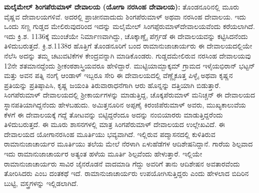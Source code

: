 \textbf{ಮಲೈಮೇಲ್​ ಶಿಂಗಪೆರುಮಾಳ್​ ದೇವಾಲಯ (ಯೋಗಾ ನರಸಿಂಹ ದೇವಾಲಯ):} ತೊಂಡನೂರಿನಲ್ಲಿ ಮೂರು ವೈಷ್ಣವ ದೇವಾಲಯಗಳಿವೆ. ಅದರಲ್ಲಿ ಪ್ರಾಚೀನವಾದುದು ಶಿಂಗಪೆರುಮಾಳ್​ ಅಥವಾ ನರಸಿಂಹ ದೇವಾಲಯ. ಇದು ಒಂದು ಸಣ್ಣ ಗುಡ್ಡದ ಮೇಲಿರುವುದರಿಂದ ಇದನ್ನು ಮಲೈಮೇಲ್​ ಸಿಂಗಪ್ಪೆರುಮಾಳ್​ ದೇವಾಲಯವೆಂದು ಕರೆಯಲಾಗಿದೆ. ಇದು ಕ್ರಿ.ಶ. 1136ಕ್ಕೆ ಮುಂಚೆಯೇ ನಿರ್ಮಾಣವಾಗಿದ್ದು, ಚೊಕ್ಕಾಣ್ಡೈ ಪೆರ್ಗ್ಗಡೆ ಈ ದೇವಾಲಯವನ್ನು ಕಟ್ಟಿಸಿದನೆಂದು ತಿಳಿದುಬರುತ್ತದೆ. ಕ್ರಿ.ಶ.1138ರ ಹೊತ್ತಿಗೆ ತೊಂಡನೂರಿಗೆ ಬಂದ ರಾಮಾನುಜಾಚಾರ್ಯರು ಈ ದೇವಾಲಯದಲ್ಲಿಯೇ ನೆಲೆಸಿ ಅದನ್ನು ತಮ್ಮ ಚಟುವಟಿಕೆಗಳ ಕೇಂದ್ರವನ್ನಾಗಿ ಮಾಡಿಕೊಂಡರು. ಗುಡ್ಡದಮೇಲಿರುವ ನರಸಿಂಹ ದೇವಾಲಯವು 12ನೇ ಶತಮಾನದ್ದೆಂದು ಶ‍್ರೀಕಂಠಶಾಸ್ತ್ರಿಯವರೂ ಹೇಳಿದ್ದಾರೆ. ಮುಟ್ಟಿಯಾಮ್ಬಾಕ್ಕಮ್ ಗ್ರಾಮದ ಇಳೈಯಭಿರಾನ್​ ಭಟ್ಟನ್​ ಮತ್ತು ಅವನ ಪತ್ನಿ ನಂಗೈ ಆಂಡಾಳ್​ ಇಬ್ಬರೂ ಸೇರಿ ಈ ದೇವಾಲಯದಲ್ಲಿ ವೆಣ್ಣೈಕೂತ್ತ ಪಿಳ್ಳೈ ಅಥವಾ ಕೃಷ್ಣನ ಪ್ರತಿಯನ್ನು ಪ್ರತಿಷ್ಠಾಪಿಸಿ, ಕೃಷ್ಣ ಜಯಂತಿ ತಿರುವಾರಾಧನೆಗಾಗಿ ಆರು ಹೊನ್ನನ್ನು ದತ್ತಿಯಾಗಿ ಬಿಡುತ್ತಾರೆ. ಸಿಂಗಪೆರುಮಾಳ್​ ದೇವಾಲಯದಲ್ಲಿ ಶ‍್ರೀಕಾರ್ಯಗಳನ್ನು ಮಾಡುತ್ತಿದ್ದ, ಚೊಕ್ಕಪೆರುಮಾಳ್​ ಮನಿಚ್ಚನ್​ ಈ ದೇವಾಲಯದ ಸ್ಥಾನಪತಿಯಾಗಿದ್ದನೆಂದು ಹೇಳಬಹುದು. ಅಮಿತ್ತನೂರಿನ ಅಪ್ಪಣೈ ಕಿರಂಜಿಪೆರುಮಾಳ್​ ಅವರು, ಮುಖ್ಯಕಾಲುವೆಯ ಕೆಳಗೆ ಈ ದೇವಾಲಯಕ್ಕೆ ಗದ್ದೆ ತೋಟವನ್ನು ಬಿಟ್ಟಿದ್ದರೆಂದೂ ಅದನ್ನು ನಂಬಿಯಾರರು ಮಾಡುತ್ತಿದ್ದರೆಂದು ತಿಳಿದುಬರುತ್ತದೆ. ಈ ಮೂರು ಶಾಸನಗಳಲ್ಲಿ ಮಾತ್ರ ಸಿಂಗಪೆರುಮಾಳ್​ ದೇವಾಲಯದ ಉಲ್ಲೇಖವಿದೆ. ಈ ದೇವಾಲಯದ ಯೋಗಾನರಸಿಂಹ ಮೂರ್ತಿಯು ಭವ್ಯವಾಗಿದೆ. ಇಲ್ಲಿರುವ ಪದ್ಮಾಸನದಲ್ಲಿ ಕುಳಿತಿರುವ ರಾಮಾನುಜಾಚಾರ್ಯರ ಮೂರ್ತಿಯು ತಲೆಯ ಮೇಲೆ ನೆರಳಾಗಿ ಏಳುಹೆಡೆಗಳ ಆದಿಶೇಷನಿದ್ದಾನೆ. ಗಾರೆಯ ಶಿಲ್ಪವಾದ ಇದು ರಾಮಾನುಜಾಚಾರ್ಯರ ಅತ್ಯಂತ ಹಳೆಯ ಮೂರ್ತಿ ಶಿಲ್ಪವೆಂದು ಹೇಳುತ್ತಾರೆ. ಇಲ್ಲಿಯೇ ರಾಮಾನುಜಾಚಾರ್ಯರು ಸಾವಿರ ಜೈನರೊಡನೆ ವಾದಮಾಡಿ ಗೆದ್ದು ಅವರಿಗೆ ತಾನು ಆದಿಶೇಷನ ಅವತಾರವೆಂದು ತೋರಿಸಿದರು ಎಂಬ ದಂತಕಥೆ ಇದೆ. ರಾಮಾನುಜಾಚಾರ್ಯರು ಉಪಯೋಗಿಸುತ್ತಿದ್ದರು ಎಂದು ಹೇಳಲಾದ ಬಿದಿರಿನ ಬುಟ್ಟಿ, ವಸ್ತ್ರಗಳನ್ನು ಇಲ್ಲಿಡಲಾಗಿದೆ.

